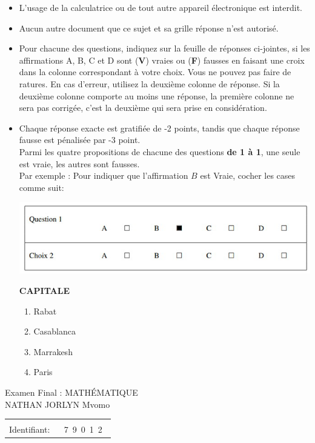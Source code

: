 \documentclass{book}%
\begin{document}
\begin{itemize}%
\item%
L'usage de la calculatrice ou de tout autre appareil électronique est interdit.%
\item%
Aucun autre document que ce sujet et sa grille réponse n'est autorisé.%
\item%
Pour chacune des questions, indiquez sur la feuille de réponses ci-jointes, si les affirmations A, B, C et D sont (\textbf{V}) vraies ou (\textbf{F}) fausses en faisant une croix dans la colonne correspondant à votre choix. Vous ne pouvez pas faire de ratures. En cas d'erreur, utilisez la deuxième colonne de réponse. Si la deuxième colonne comporte au moins une réponse, la première colonne ne sera pas corrigée, c'est la deuxième qui sera prise en considération.%
\item%
Chaque réponse exacte est gratifiée de -2 points, tandis que chaque réponse fausse est pénalisée par -3 point. \\ 	Parmi les quatre propositions de chacune des questions \textbf{de 1 à 1}, une seule est vraie, les autres sont fausses. \\ 	Par exemple : Pour indiquer que l'affirmation $B$ est Vraie, cocher les cases comme suit:  \\ \begin{center}	\includegraphics[scale=0.8]{reponses.png} \end{center}%
\thispagestyle{empty}%
\begin{exercise}%
\textbf{CAPITALE }%
\begin{enumerate}[label=\textbf{\Alph*. }]%
\item%
Rabat%
\item%
Casablanca%
\item%
Marrakesh%
\item%
Paris%
\end{enumerate}%
\end{exercise}%
\end{itemize}%
\newpage%
\thispagestyle{empty}%
Examen Final : MATHÉMATIQUE $\qquad \qquad \qquad \qquad \qquad \qquad \qquad \qquad$ NATHAN JORLYN Mvomo%
\begin{flushright}%
\begin{tabular}{|l|}%
\hline%
 \\%
\thispagestyle{empty}%
Identifiant: $\quad$ {\Large 7~9~0~1~2~}%
 \\%
\hline%
\end{tabular}%
\end{flushright}%
\end{document}
